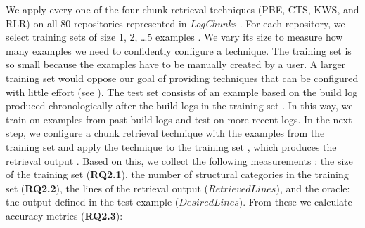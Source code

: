 We apply every one of the four chunk retrieval techniques
(PBE, CTS, KWS, and RLR) on all 80 repositories represented in
\emph{LogChunks} .
For each repository, we select training sets of size 1, 2, \dots 5
examples .
We vary its size to measure how many examples we need to
confidently configure a technique.
The training set is so small because the examples have to be
manually created by a user.
A larger training set would oppose our goal of providing techniques
that can be configured with little effort
(see ).
The test set consists of an example based on the build log produced
chronologically after the build logs in the training set .
In this way, we train on examples from past build logs and test on
more recent logs.
In the next step, we configure a chunk retrieval technique with
the examples from the training set  and apply the technique
to the
training set , which produces the retrieval output
.
Based on this, we collect the following measurements :
the size of the training set (\textbf{RQ2.1}),
the number of structural categories in the training
set (\textbf{RQ2.2}),
the lines of the retrieval output ($\mathit{RetrievedLines}$),
and the oracle: the output defined in the test example
($\mathit{DesiredLines}$).
From these we calculate accuracy metrics (\textbf{RQ2.3}):

